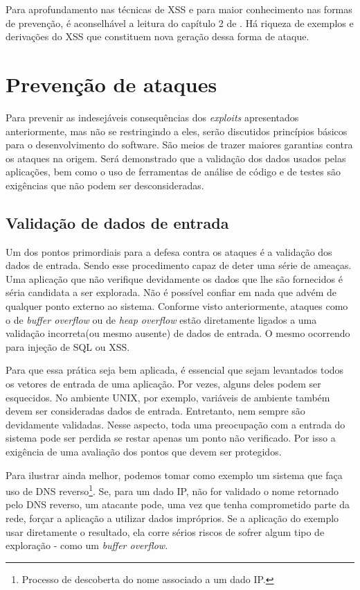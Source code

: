 			Para aprofundamento nas técnicas de XSS e para maior conhecimento nas formas de prevenção,
			é aconselhável a leitura do capítulo 2 de \cite{Dhanjani2009}. Há riqueza de exemplos e
			derivações do XSS que constituem nova geração dessa forma de ataque.
			

	\section{Prevenção de ataques}
		Para prevenir as indesejáveis consequências dos \textsl{exploits} apresentados
		anteriormente, mas não se restringindo a eles, serão discutidos princípios básicos
		para o desenvolvimento do software. São meios de trazer maiores garantias contra os ataques
		na origem. Será demonstrado que a validação dos dados usados pelas aplicações, bem como
		o uso de ferramentas de análise de código e de testes são exigências que não podem
		ser desconsideradas. 

		
		\subsection{Validação de dados de entrada}
			Um dos pontos primordiais para a defesa contra os ataques é a validação dos dados de entrada.
			Sendo esse procedimento capaz de deter uma série de ameaças. Uma aplicação que não verifique
			devidamente os dados que lhe são fornecidos é séria candidata a ser explorada. Não é possível
			confiar em nada que advém de qualquer ponto externo ao sistema. Conforme visto anteriormente,
			ataques como o de \textsl{buffer overflow} ou de \textsl{heap overflow} estão diretamente
			ligados a uma validação incorreta(ou mesmo ausente) de dados de entrada. O mesmo ocorrendo
			para injeção de SQL ou XSS.


			Para que essa prática seja bem aplicada, é essencial que sejam levantados todos os vetores
			de entrada de uma aplicação. Por vezes, alguns deles podem ser esquecidos. No ambiente UNIX,
			por exemplo, variáveis de ambiente também devem ser consideradas dados de entrada. Entretanto,
			nem sempre são devidamente validadas. Nesse aspecto, toda uma preocupação com a entrada
			do sistema pode ser perdida se restar apenas um ponto não verificado. Por isso a exigência
			de uma avaliação dos pontos que devem ser protegidos.


			Para ilustrar ainda melhor, podemos tomar como exemplo um sistema que faça uso de 
			DNS reverso\footnote{Processo de descoberta do nome associado a um dado IP.}. Se, para um
			dado IP, não for validado o nome retornado pelo DNS reverso, um atacante pode, uma vez que
			tenha comprometido parte da rede, forçar a aplicação a utilizar dados impróprios.
			Se a aplicação do exemplo usar diretamente o resultado, ela corre sérios riscos de sofrer
			algum tipo de exploração - como um \textsl{buffer overflow}.


